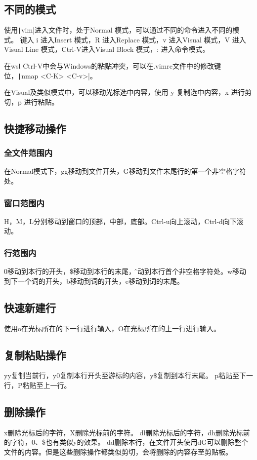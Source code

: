 \documentclass[fontset=ubuntu]{ctexart}
\begin{document}
\begin{sloppypar}
\subsection{不同的模式}
使用\texttt|vim|进入文件时，处于Normal 模式，可以通过不同的命令进入不同的模式。
键入 i 进入Insert 模式，R 进入Replace 模式，v 进入Visual 模式，V 进入Visual Line 模式，Ctrl-V进入Visual Block 模式，: 进入命令模式。

在wsl Ctrl-V中会与Windows的粘贴冲突，可以在.vimrc文件中的修改键位，\texttt|nmap <C-K> <C-v>|。

在Visual及类似模式中，可以移动光标选中内容，使用 y 复制选中内容，x 进行剪切，p 进行粘贴。

\subsection{快捷移动操作}
\subsubsection{全文件范围内}
在Normal模式下，gg移动到文件开头，G移动到文件末尾行的第一个非空格字符处。

\subsubsection{窗口范围内}
H，M，L分别移动到窗口的顶部，中部，底部。Ctrl-u向上滚动，Ctrl-d向下滚动。

\subsubsection{行范围内}
0移动到本行的开头，\$移动到本行的末尾，\^移动到本行首个非空格字符处。w移动到下一个词的开头，b移动到词的开头，e移动到词的末尾。

\subsection{快速新建行}
使用o在光标所在的下一行进行输入，O在光标所在的上一行进行输入。

\subsection{复制粘贴操作}
yy复制当前行，y0复制本行开头至游标的内容，y\$复制到本行末尾。
p粘贴至下一行，P粘贴至上一行。


\subsection{删除操作}
x删除光标后的字符，X删除光标前的字符。
dl删除光标后的字符，dh删除光标前的字符，0、\$也有类似y的效果。
dd删除本行，在文件开头使用dG可以删除整个文件的内容。但是这些删除操作都类似剪切，会将删除的内容存至剪贴板。


\end{sloppypar}
\end{document}
